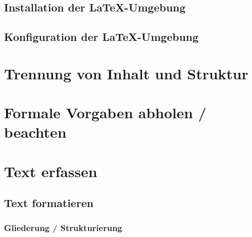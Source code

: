 \documentclass[12pt, a4paper, sectionentrydots=true, listof=totoc, listof=entryprefix, numbers=endperiod]{scrartcl}
\begin{document}
\subsection{Installation der LaTeX-Umgebung} \label{Installation}
\begin{spacing}{1.25}

\end{spacing}
%
%
\subsection{Konfiguration der LaTeX-Umgebung} \label{Konfiguration}
\begin{spacing}{1.25}

\end{spacing}
%
%
%
%
%
%
\pagebreak 
\section{Trennung von Inhalt und Struktur} 
\begin{spacing}{1.25}

\end{spacing}
%
%
%
%
%
%
\pagebreak 
\section{Formale Vorgaben abholen / beachten} 
\begin{spacing}{1.25}

\end{spacing}
%
%
%
%
%
%
\pagebreak 
\section{Text erfassen} 
\begin{spacing}{1.25}

\end{spacing}
%
%
\subsection{Text formatieren}
\label{TextFormatieren}
\begin{spacing}{1.25}

\end{spacing}
%
%
\subsubsection{Gliederung / Strukturierung}
\begin{spacing}{1.25}

\end{spacing}
%
%
\end{document}
